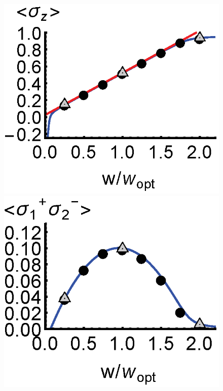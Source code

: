 \documentclass[aps,prl,twocolumn,
superscriptaddress,groupedaddress]{revtex4}
\begin{document}
\begin{figure}
\begin{center}
	\includegraphics[scale =0.38] {N40LaserSZ.eps}
	\hspace{-5.0mm} \includegraphics[scale =0.38] {N40LaserSPSM.eps}

\end{center}
\end{figure}
\end{document}
